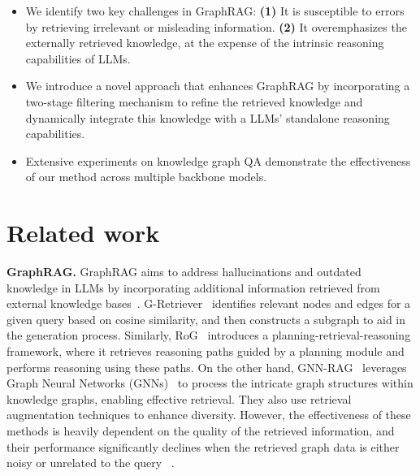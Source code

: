 \documentclass[11pt]{article}
\begin{document}
\begin{itemize}  

\item We identify two key challenges in GraphRAG: {\bf (1)} It is susceptible to errors by retrieving irrelevant or misleading information. {\bf (2)} It overemphasizes the externally retrieved knowledge, at the expense of the intrinsic reasoning capabilities of LLMs. 

\item We introduce a novel approach that enhances GraphRAG by incorporating a two-stage filtering mechanism to refine the retrieved knowledge and dynamically integrate this knowledge with a LLMs' standalone reasoning capabilities.

\item Extensive experiments on knowledge graph QA demonstrate the effectiveness of our method across multiple backbone models.  

\end{itemize}
\section{Related work}
\textbf{GraphRAG.} 
GraphRAG aims to address hallucinations and outdated knowledge in LLMs by incorporating additional information retrieved from external knowledge bases~\cite{sunthink,li2024subgraphrag,dong2024don}.  G-Retriever~\cite{he2025g} identifies relevant nodes and edges for a given query based on cosine similarity, and then constructs a subgraph to aid in the generation process. Similarly, RoG~\cite{luo2024rog} introduces a planning-retrieval-reasoning framework, where it retrieves reasoning paths guided by a planning module and performs reasoning using these paths. On the other hand, GNN-RAG~\cite{mavromatis2024gnn} leverages Graph Neural Networks (GNNs)~\cite{kipf2016semi} to process the intricate graph structures within knowledge graphs, enabling effective retrieval. They also use retrieval augmentation techniques to enhance diversity.
However, the effectiveness of these methods is heavily dependent on the quality of the retrieved information, and their performance significantly declines when the retrieved graph data is either noisy or unrelated to the query~\cite{he2025g} .
\end{document}
